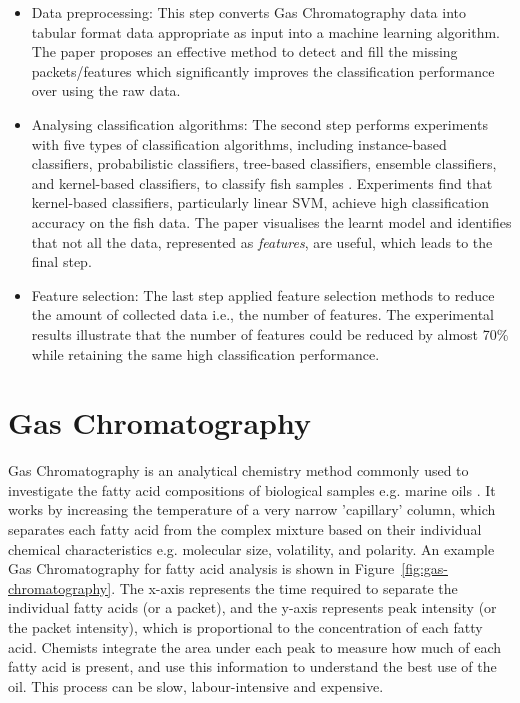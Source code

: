 \documentclass[runningheads]{llncs}
\begin{document}
\begin{itemize}
	\item Data preprocessing: This step converts Gas Chromatography data into tabular format data appropriate as input into a machine learning algorithm. 
	The paper proposes an effective method to detect and fill the missing packets/features which significantly improves the classification performance over using the raw data.
	\item Analysing classification algorithms: The second step performs experiments with five types of classification algorithms, including instance-based classifiers, probabilistic classifiers, tree-based classifiers, ensemble classifiers, and kernel-based classifiers, to classify fish samples \cite{cortes1995support,fix1989discriminatory,hand2001idiot,ho1995random,loh2011classification}. 
	Experiments find that kernel-based classifiers, particularly linear SVM, achieve high classification accuracy on the fish data. 
	The paper visualises the learnt model and identifies that not all the data, represented as \textit{features}, are useful, which leads to the final step.
	\item Feature selection: The last step applied feature selection methods to reduce the amount of collected data i.e., the number of features. 
	The experimental results illustrate that the number of features could be reduced by almost 70\% while retaining the same high classification performance.
\end{itemize}

\section{Gas Chromatography}

Gas Chromatography is an analytical chemistry method commonly used to investigate the fatty acid compositions of biological samples e.g. marine oils \cite{eder1995gas,restek2018high}. 
It works by increasing the temperature of a very narrow 'capillary' column, which separates each fatty acid from the complex mixture based on their individual chemical characteristics e.g. molecular size, volatility, and polarity. 
An example Gas Chromatography for fatty acid analysis is shown in Figure~\ref{fig:gas-chromatography}. 
The x-axis represents the time required to separate the individual fatty acids (or a packet), and the y-axis represents peak intensity (or the packet intensity), which is proportional to the concentration of each fatty acid. 
Chemists integrate the area under each peak to measure how much of each fatty acid is present, and use this information to understand the best use of the oil. 
This process can be slow, labour-intensive and expensive.
\end{document}
